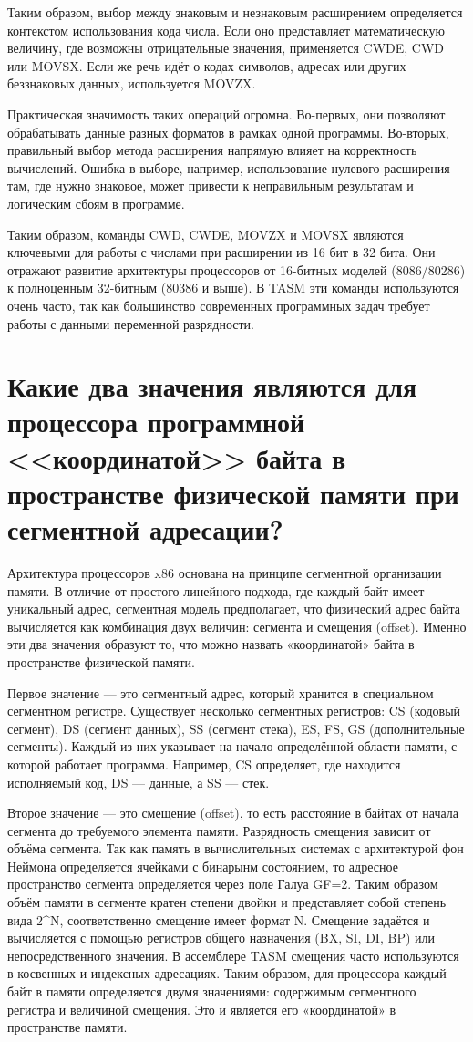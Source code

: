 Таким образом, выбор между знаковым и незнаковым расширением определяется контекстом использования кода числа. Если оно представляет математическую величину, где возможны отрицательные значения, применяется CWDE, CWD или MOVSX. Если же речь идёт о кодах символов, адресах или других беззнаковых данных, используется MOVZX.

Практическая значимость таких операций огромна. Во-первых, они позволяют обрабатывать данные разных форматов в рамках одной программы. Во-вторых, правильный выбор метода расширения напрямую влияет на корректность вычислений. Ошибка в выборе, например, использование нулевого расширения там, где нужно знаковое, может привести к неправильным результатам и логическим сбоям в программе.

Таким образом, команды CWD, CWDE, MOVZX и MOVSX являются ключевыми для работы с числами при расширении из 16 бит в 32 бита. Они отражают развитие архитектуры процессоров от 16-битных моделей (8086/80286) к полноценным 32-битным (80386 и выше). В TASM эти команды используются очень часто, так как большинство современных программных задач требует работы с данными переменной разрядности.


\section{Какие два значения являются для процессора программной <<координатой>> байта в пространстве физической памяти при сегментной адресации?}

Архитектура процессоров x86 основана на принципе сегментной организации памяти. В отличие от простого линейного подхода, где каждый байт имеет уникальный адрес, сегментная модель предполагает, что физический адрес байта вычисляется как комбинация двух величин: сегмента и смещения (offset). Именно эти два значения образуют то, что можно назвать «координатой» байта в пространстве физической памяти.

Первое значение — это сегментный адрес, который хранится в специальном сегментном регистре. Существует несколько сегментных регистров: CS (кодовый сегмент), DS (сегмент данных), SS (сегмент стека), ES, FS, GS (дополнительные сегменты). Каждый из них указывает на начало определённой области памяти, с которой работает программа. Например, CS определяет, где находится исполняемый код, DS — данные, а SS — стек.

Второе значение — это смещение (offset), то есть расстояние в байтах от начала сегмента до требуемого элемента памяти. Разрядность смещения зависит от объёма сегмента. Так как память в вычислительных системах с архитектурой фон Неймона определяется ячейками с бинарынм состоянием, то адресное пространство сегмента определяется через поле Галуа GF=2. Таким образом объём памяти в сегменте кратен степени двойки и представляет собой степень вида 2^N, соответственно смещение имеет формат N. Смещение задаётся  и вычисляется с помощью регистров общего назначения (BX, SI, DI, BP) или непосредственного значения. В ассемблере TASM смещения часто используются в косвенных и индексных адресациях.
Таким образом, для процессора каждый байт в памяти определяется двумя значениями: содержимым сегментного регистра и величиной смещения. Это и является его «координатой» в пространстве памяти.

